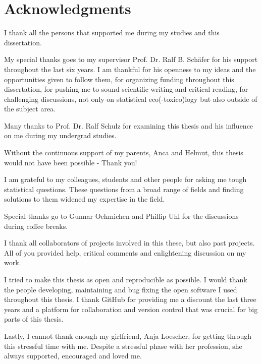 


\begingroup
\let\clearpage\relax
\let\cleardoublepage\relax
\let\cleardoublepage\relax

\chapter*{Acknowledgments}
\thispagestyle{empty}

I thank all the persons that supported me during my studies and this dissertation.

\noindent My special thanks goes to my supervisor Prof. Dr. Ralf B. Schäfer for his support throughout the last six years. 
I am thankful for his openness to my ideas and the opportunities given to follow them, 
for organizing funding throughout this dissertation, 
for pushing me to sound scientific writing and critical reading, 
for challenging discussions, not only on statistical eco(-toxico)logy but also outside of the subject area.

\noindent Many thanks to Prof. Dr. Ralf Schulz for examining this thesis and his influence on me during my undergrad studies.

\noindent Without the continuous support of my parents, Anca and Helmut, this thesis would not have been possible - Thank you!

\noindent I am grateful to my colleagues, students and other people for asking me tough statistical questions. 
These questions from a broad range of fields and finding solutions to them widened my expertise in the field.

\noindent Special thanks go to Gunnar Oehmichen and Phillip Uhl for the discussions during coffee breaks.

\noindent I thank all collaborators of projects involved in this these, but also past projects. All of you provided help, critical comments and enlightening discussion on my work.

\noindent I tried to make this thesis as open and reproducible as possible. I would thank the people developing, maintaining and bug fixing the open software I used throughout this thesis. I thank GitHub for providing me a discount the last three years and a platform for collaboration and version control that was crucial for big parts of this thesis. 

\noindent Lastly, I cannot thank enough my girlfriend, Anja Loescher, for getting through this stressful time with me.
Despite a stressful phase with her profession, she always supported, encouraged and loved me. 


\endgroup 
